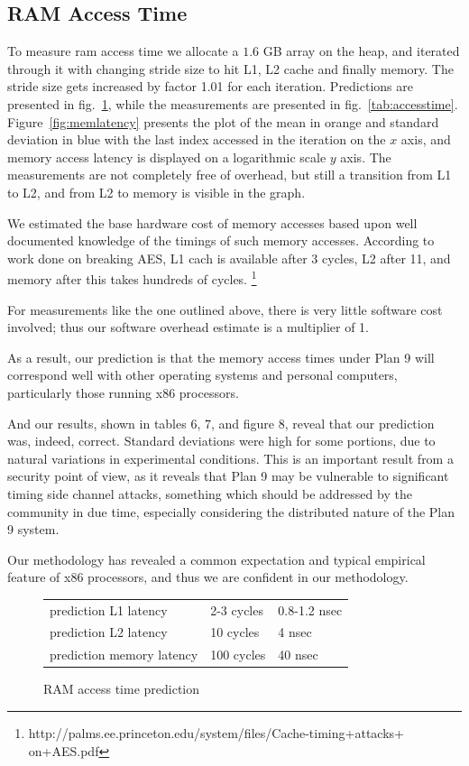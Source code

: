 \documentclass[letterpaper,twocolumn,10pt]{article}
\begin{document}
\subsection{RAM Access Time}

To measure ram access time we allocate a $1.6$ GB array on the heap, and iterated through it with changing stride size to hit L1, L2 cache and finally memory. The stride size gets increased by factor 1.01 for each iteration. Predictions are presented in fig.~\ref{tab:accesstimepred}, while the measurements are presented in fig.~\ref{tab:accesstime}. Figure~\ref{fig:memlatency} presents the plot of the mean in orange and standard deviation in blue with the last index accessed in the iteration on the $x$ axis, and memory access latency is displayed on a logarithmic scale $y$ axis. The measurements are not completely free of overhead, but still a transition from L1 to L2, and from L2 to memory is visible in the graph. 

We estimated the base hardware cost of memory accesses based upon well documented knowledge of the timings of such memory accesses. According to work done on breaking AES, L1 cach is available after 3 cycles, L2 after 11, and memory after this takes hundreds of cycles. 
\footnote{http://palms.ee.princeton.edu/system/files/Cache-timing+attacks+
on+AES.pdf}

For measurements like the one outlined above, there is very little software cost involved; thus our software overhead estimate is a multiplier of 1.

As a result, our prediction is that the memory access times under Plan 9 will correspond well with other 
operating systems and personal computers, particularly those running x86 processors.

And our results, shown in tables 6, 7, and figure 8, reveal that our prediction was, indeed, correct. Standard deviations were high for some portions, due to natural variations in experimental conditions. This is an 
important result from a security point of view, as it reveals that Plan 9 may be vulnerable to significant 
timing side channel attacks, something which should be addressed by the community in due time, especially
considering the distributed nature of the Plan 9 system.

Our methodology has revealed a common expectation and typical empirical feature of x86 processors, and 
thus we are confident in our methodology.

\begin{figure}
	\centering
	
	\begin{tabular}{lll}
		prediction L1 latency  & 2-3 cycles & 0.8-1.2 nsec  \\
		prediction L2 latency  & 10 cycles  & 4 nsec \\
		prediction memory latency  & 100 cycles   & 40 nsec \\
	\end{tabular}
	\caption{RAM access time prediction}
	\label{tab:accesstimepred}
\end{figure}
\end{document}
